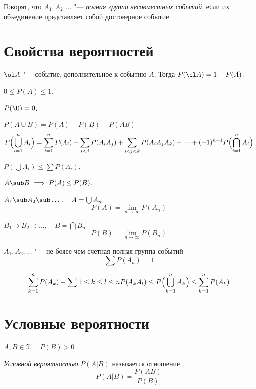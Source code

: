 \begin{definition}
	Говорят, что $ A_1, A_2, \dotsc $ "--- \emph{полная группа несовместных событий},
	если их объединение представляет собой достоверное событие.
\end{definition}

\section{Свойства вероятностей}

\begin{props}
\item $ \ol A $ "--- событие, дополнительное к событию $ A $.
	Тогда $ P(\ol A) = 1 - P(A) $.
\item $ 0 \le P(A) \le 1 $.
\item $ P(\O) = 0 $.
\item $ P(A \cup B) = P(A) + P(B) - P(AB) $
	$$ P \Bigl( \bigcup_{i = 1}^n A_i \Bigr) =
	\sum_{i = 1}^n P(A_i) - \sum_{i < j} P(A_iA_j) + \sum_{i < j < k}P(A_iA_jA_k) -
	\dots + (-1)^{n + 1}P \Bigl( \bigcap_{i = 1}^n A_i \Bigr) $$
\item $ P(\bigcup A_i) \le \sum P(A_i) $.
\item $ A \sub B \implies P(A) \le P(B) $.
\item $ A_1 \sub A_2 \sub \dotso, \quad A = \bigcup A_n $
	$$ P(A) = \lim\limits_{n \to \infty} P(A_n) $$
\item $ B_1 \supset B_2 \supset \dotso, \quad B = \bigcap B_n $
	$$ P(B) = \lim\limits_{n \to \infty} P(B_n) $$
\item $ A_1, A_2, \dotsc $ "--- не более чем счётная полная группа событий
	$$ \sum P(A_n) = 1 $$
\end{props}

\begin{statement}
	$$ \sum_{k = 1}^n P(A_k) - \sum{1 \le k \le l \le n} P(A_kA_l) \le
	P \Bigl( \bigcup_{k = 1}^n A_k \Bigr) \le \sum_{k = 1}^n P(A_k) $$
\end{statement}

\section{Условные вероятности}

\begin{definition}
	$ A, B \in \Im, \quad P(B) > 0 $

	\emph{Условной вероятностью} $ P(A|B) $ называется отношение
	$$ P(A|B) = \frac{P(AB)}{P(B)} $$
\end{definition}


